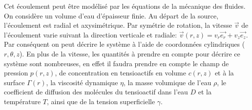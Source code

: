 \documentclass[french, 10pt]{article}
\begin{document}
Cet écoulement peut être modélisé par les équations de la mécanique des fluides. On considère un volume d'eau d'épaisseur finie. Au départ de la source, l'écoulement est radial et axysimétrique. Par symétrie de rotation, la vitesse $\vec{v}$ de l'écoulement varie suivant la direction verticale et radiale: $\vec{v}(r,z)=v_r\vec{e_r}+v_{z}\vec{e_z}$. Par conséquent on peut décrire le système à l'aide de coordonnées cylindriques ($r,\theta,z$). En plus de la vitesse, les quantités à prendre en compte pour décrire ce système sont nombreuses, en effet il faudra prendre en compte le champ de pression $p(r,z)$, de concentration en tensioactifs en volume $c(r,z)$ et à la surface $\Gamma(r)$, la viscosité dynamique $\eta$, la masse volumique de l'eau $\rho$, le coefficient de diffusion des molécules du tensioactif dans l'eau $D$ et la température $T$, ainsi que de la tension superficielle $\gamma$.\medskip


\noindent
\begin{minipage}[c]{0.4\linewidth}
    \label{TABLE:quantites}
\end{minipage}\hfill%
\begin{minipage}[c]{0.5\linewidth}
    \resizebox{1.1\columnwidth}{!}{}
    \label{fig:SketchPrincipe}
\end{minipage}
\end{document}
